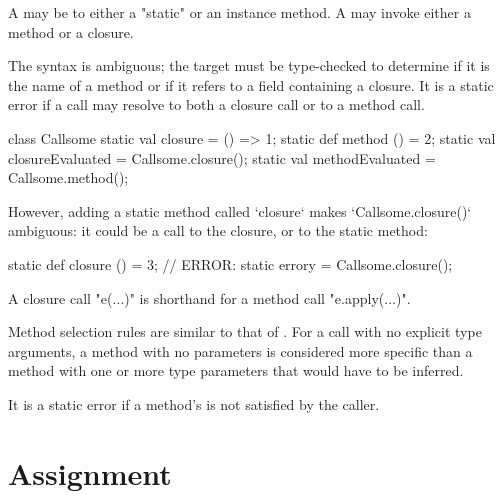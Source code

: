 A  may be to either a \xcd"static" or an 
instance method.  A  may invoke either a method
or a closure.  

The syntax is ambiguous; the target must be type-checked to determine if it is
the name of a method or if it refers to a field containing a closure. It is a
static error if a call may resolve to both a closure call or to a method call.
\begin{xten}
class Callsome {
  static val closure = () => 1;
  static def method () = 2;
  static val closureEvaluated = Callsome.closure();
  static val methodEvaluated = Callsome.method();
}
\end{xten}
%
However, adding a static method called \xcd`closure` makes \xcd`Callsome.closure()`
ambiguous: it could be a call to the closure, or to the static method: 

\begin{xten}
  static def closure () = 3;
  // ERROR: static errory = Callsome.closure();
\end{xten}

A closure call \xcdmath"e($\dots$)" is shorthand for a method call
\xcdmath"e.apply($\dots$)". 

Method selection rules are similar to that of \java{}.
For a call with no explicit type arguments, a method with 
no parameters is considered more specific than a method with one or more
type parameters that would have to be inferred.

It is a static error if a method's  is not satisfied by the
caller. 

\section{Assignment}\label{AssignmentStatement}

